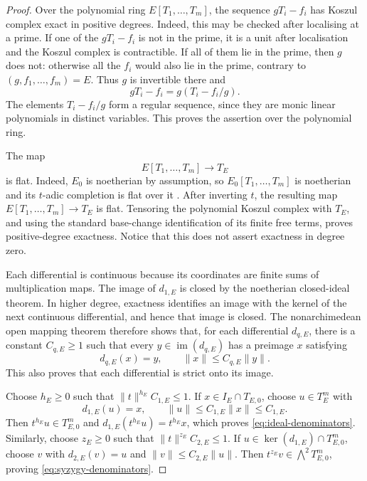 \documentclass[11pt,reqno]{amsart}
\theoremstyle{definition}
\newcommand{\im}{\operatorname{im}}
\begin{document}
\begin{proof}
Over the polynomial ring $E[T_1,\ldots,T_m]$, the sequence
$gT_i-f_i$ has Koszul complex exact in positive degrees.  Indeed, this may be
checked after localising at a prime.  If one of the $gT_i-f_i$ is not in the
prime, it is a unit after localisation and the Koszul complex is contractible.
If all of them lie in the prime, then $g$ does not: otherwise all the $f_i$
would also lie in the prime, contrary to $(g,f_1,\ldots,f_m)=E$.  Thus $g$ is
invertible there and
\[
  gT_i-f_i=g(T_i-f_i/g).
\]
The elements $T_i-f_i/g$ form a regular sequence, since they are monic linear
polynomials in distinct variables.  This proves the assertion over the
polynomial ring.

The map
\[
  E[T_1,\ldots,T_m]\longrightarrow T_E
\]
is flat.  Indeed, $E_0$ is noetherian by assumption, so
$E_0[T_1,\ldots,T_m]$ is noetherian and its $t$-adic completion is flat
over it \cite[Tag~00MB]{Stacks}.  After inverting $t$, the resulting map
$E[T_1,\ldots,T_m]\to T_E$ is flat.  Tensoring the polynomial Koszul complex with $T_E$, and using the
standard base-change identification of its finite free terms, proves
positive-degree exactness.  Notice that this does not assert exactness in
degree zero.

Each differential is continuous because its coordinates are finite sums of
multiplication maps.  The image of $d_{1,E}$ is closed by the noetherian
closed-ideal theorem.  In higher degree, exactness identifies an image with
the kernel of the next continuous differential, and hence that image is
closed.  The nonarchimedean open mapping theorem therefore shows that, for
each differential $d_{q,E}$, there is a constant $C_{q,E}\geq1$ such that
every $y\in\im(d_{q,E})$ has a preimage $x$ satisfying
\[
  d_{q,E}(x)=y,
  \qquad
  \lVert x\rVert\leq C_{q,E}\lVert y\rVert.
\]
This also proves that each differential is strict onto its image.

Choose $h_E\geq0$ such that
$\lVert t\rVert^{h_E}C_{1,E}\leq1$.  If
$x\in I_E\cap T_{E,0}$, choose $u\in T_E^m$ with
\[
  d_{1,E}(u)=x,
  \qquad
  \lVert u\rVert\leq C_{1,E}\lVert x\rVert\leq C_{1,E}.
\]
Then $t^{h_E}u\in T_{E,0}^m$ and
$d_{1,E}(t^{h_E}u)=t^{h_E}x$, which proves
\eqref{eq:ideal-denominators}.  Similarly, choose $z_E\geq0$ such that
$\lVert t\rVert^{z_E}C_{2,E}\leq1$.  If
$u\in\ker(d_{1,E})\cap T_{E,0}^m$, choose $v$ with
$d_{2,E}(v)=u$ and
$\lVert v\rVert\leq C_{2,E}\lVert u\rVert$.  Then
$t^{z_E}v\in\bigwedge^2T_{E,0}^m$, proving
\eqref{eq:syzygy-denominators}.
\end{proof}
\end{document}
